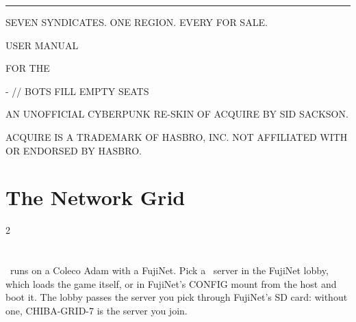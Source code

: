 \documentclass[12pt,letterpaper]{article}
\begin{document}
\begin{titlepage}
\machine
\vspace*{1.6in}
{\color{amber}\rule{\linewidth}{2pt}}\par\vspace{14pt}
{\fontsize{44}{48}\selectfont \game\par}\vspace{10pt}
{\fontsize{12}{16}\selectfont\color{steel} SEVEN SYNDICATES. ONE REGION. EVERY \MakeUppercase{} FOR SALE.\par}
\vspace{14pt}{\color{amber}\rule{\linewidth}{2pt}}\par
\vspace{0.35in}
{\fontsize{24}{30}\selectfont USER MANUAL\par}\vspace{4pt}
{\fontsize{14}{18}\selectfont\color{amber} FOR THE \MakeUppercase{\PlatformLong}\par}
\vspace{0.4in}
{\fontsize{12}{16}\selectfont \PlatformMachines\par
{}- \MakeUppercase{} \quad // \quad BOTS FILL EMPTY SEATS\par}
\vfill
{\fontsize{8.5}{11}\selectfont\color{steel}
AN UNOFFICIAL CYBERPUNK RE-SKIN OF ACQUIRE BY SID SACKSON.\par
ACQUIRE IS A TRADEMARK OF HASBRO, INC. NOT AFFILIATED WITH OR ENDORSED BY HASBRO.\par}
\end{titlepage}

\renewcommand{\secstatus}{THE SETTING \quad // \quad THE OBJECT \quad // \quad THE END}
\chapter{The Network Grid}
\begin{multicols}{2}
\end{multicols}

\renewcommand{\secstatus}{REGION \quad // \quad STATUS \quad // \quad HANDLE}
\chapter{}
\game\ runs on a Coleco Adam with a FujiNet. Pick a \game\ server in the FujiNet lobby, which loads the game
itself, or in FujiNet's CONFIG mount  from the host  and boot
it. The lobby passes the server you pick through FujiNet's SD card: without one, CHIBA-GRID-7 is the server you join.
\end{document}
